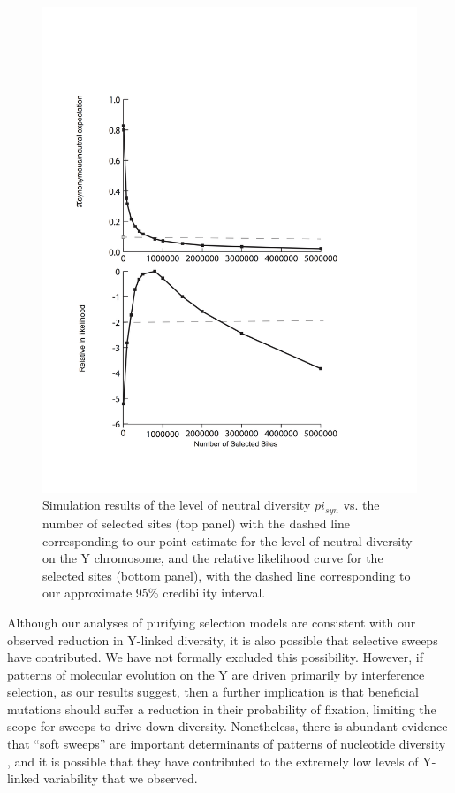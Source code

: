 \documentclass[9pt,twocolumn,twoside]{gsajnl}
\begin{document}
\begin{figure}[t!]
\centering
\noindent
\includegraphics[width=\linewidth]{figure3.jpg}
\caption{Simulation results of the level of neutral diversity $pi_{syn}$ vs. the number of selected sites (top panel) with the dashed line corresponding to our point estimate for the level of neutral diversity on the Y chromosome, and the relative likelihood curve for the selected sites (bottom panel), with the dashed line corresponding to our approximate 95\% credibility interval.
}
\label{fig:spectrum}
\end{figure}

Although our analyses of purifying selection models are consistent with our observed reduction in Y-linked diversity, it is also possible that selective sweeps have contributed. We have not formally excluded this possibility. However, if patterns of molecular evolution on the Y are driven primarily by interference selection, as our results suggest, then a further implication is that beneficial mutations should suffer a reduction in their probability of fixation, limiting the scope for sweeps to drive down diversity. Nonetheless, there is abundant evidence that “soft sweeps” are important determinants of patterns of nucleotide diversity \citep{messer2013population}, and it is possible that they have contributed to the extremely low levels of Y-linked variability that we observed.
\end{document}
